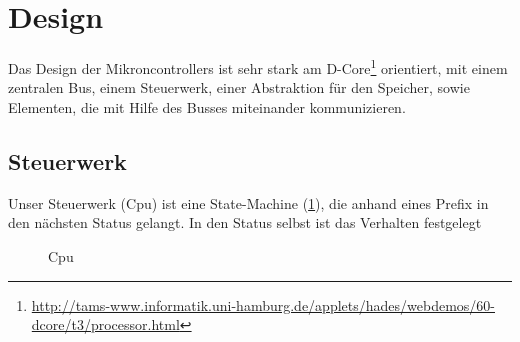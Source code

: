 \section{Design}
Das Design der Mikroncontrollers ist sehr stark am D-Core\footnote{\url{http://tams-www.informatik.uni-hamburg.de/applets/hades/webdemos/60-dcore/t3/processor.html}} orientiert, mit einem zentralen Bus, einem Steuerwerk, einer Abstraktion für den Speicher, sowie Elementen, die mit Hilfe des Busses miteinander kommunizieren.

\subsection{Steuerwerk}
Unser Steuerwerk (Cpu) ist eine State-Machine (\ref{CPU}), die anhand eines Prefix in den nächsten Status gelangt. In den Status selbst ist das Verhalten festgelegt

\begin{figure}[ht]
\caption{\label{CPU}Cpu}
\end{figure}
